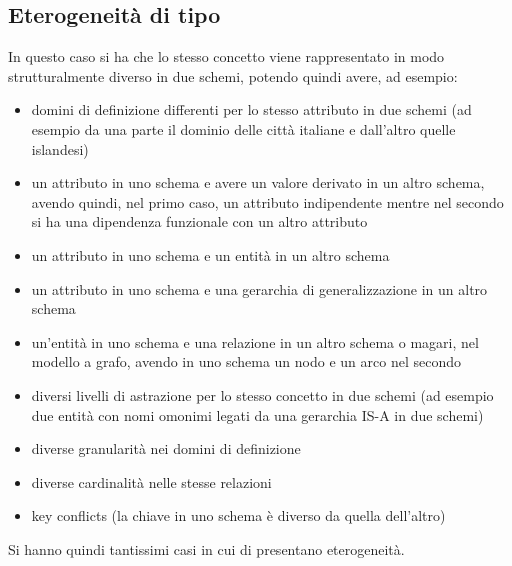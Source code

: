 \documentclass[a4paper,12pt, oneside]{book}
\begin{document}
\subsection{Eterogeneità di tipo}
In questo caso si ha che lo stesso concetto viene rappresentato in modo
strutturalmente diverso in due schemi, potendo quindi avere, ad esempio:
\begin{itemize}
  \item domini di definizione differenti per lo stesso attributo in due schemi
  (ad esempio da una parte il dominio delle città italiane e dall'altro quelle
  islandesi)
  \item un attributo in uno schema e avere un valore derivato in un altro
  schema, avendo quindi, nel primo caso, un attributo indipendente mentre nel
  secondo si ha una dipendenza funzionale con un altro attributo
  \item un attributo in uno schema e un entità in un altro schema 
  \item un attributo in uno schema e una gerarchia di generalizzazione in un
  altro schema 
  \item un'entità in uno schema e una relazione in un altro schema o magari, nel
  modello a grafo, avendo in uno schema un nodo e un arco nel secondo
  \item diversi livelli di astrazione per lo stesso concetto in due schemi
  (ad esempio due entità con nomi omonimi legati da una gerarchia IS-A in due
  schemi)  
  \item diverse granularità nei domini di definizione 
  \item diverse cardinalità nelle stesse relazioni 
  \item key conflicts (la chiave in uno schema è diverso da quella dell'altro)
\end{itemize}
Si hanno quindi tantissimi casi in cui di presentano eterogeneità.
\end{document}

